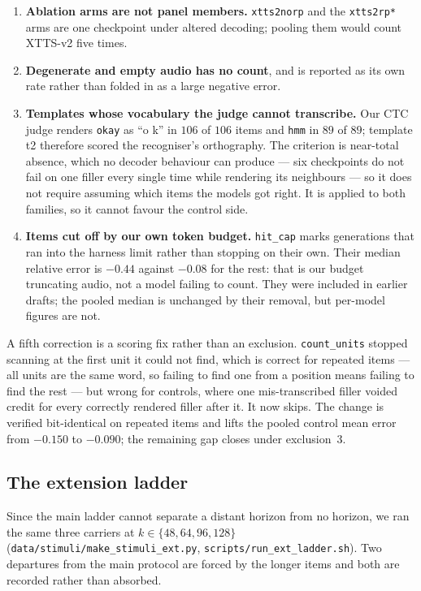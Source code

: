\documentclass[11pt]{article}
\begin{document}
\begin{enumerate}
\item \textbf{Ablation arms are not panel members.} \texttt{xtts2norp} and the
\texttt{xtts2rp*} arms are one checkpoint under altered decoding; pooling them
would count XTTS-v2 five times.
\item \textbf{Degenerate and empty audio has no count}, and is reported as its
own rate rather than folded in as a large negative error.
\item \textbf{Templates whose vocabulary the judge cannot transcribe.} Our CTC
judge renders \texttt{okay} as ``o k'' in $106$ of $106$ items and \texttt{hmm}
in $89$ of $89$; template t2 therefore scored the recogniser's orthography.
The criterion is near-total absence, which no decoder behaviour can produce ---
six checkpoints do not fail on one filler every single time while rendering its
neighbours --- so it does not require assuming which items the models got right.
It is applied to both families, so it cannot favour the control side.
\item \textbf{Items cut off by our own token budget.} \texttt{hit\_cap} marks
generations that ran into the harness limit rather than stopping on their own.
Their median relative error is $-0.44$ against $-0.08$ for the rest: that is our
budget truncating audio, not a model failing to count. They were included in
earlier drafts; the pooled median is unchanged by their removal, but per-model
figures are not.
\end{enumerate}

A fifth correction is a scoring fix rather than an exclusion. \texttt{count\_units}
stopped scanning at the first unit it could not find, which is correct for
repeated items --- all units are the same word, so failing to find one from a
position means failing to find the rest --- but wrong for controls, where one
mis-transcribed filler voided credit for every correctly rendered filler after
it. It now skips. The change is verified bit-identical on repeated items and
lifts the pooled control mean error from $-0.150$ to $-0.090$; the remaining gap
closes under exclusion~3.


\subsection{The extension ladder}
\label{sec:s10-ext}

Since the main ladder cannot separate a distant horizon from no horizon, we ran
the same three carriers at $k \in \{48, 64, 96, 128\}$
(\texttt{data/stimuli/make\_stimuli\_ext.py},
\texttt{scripts/run\_ext\_ladder.sh}). Two departures from the main protocol are
forced by the longer items and both are recorded rather than absorbed.
\end{document}
